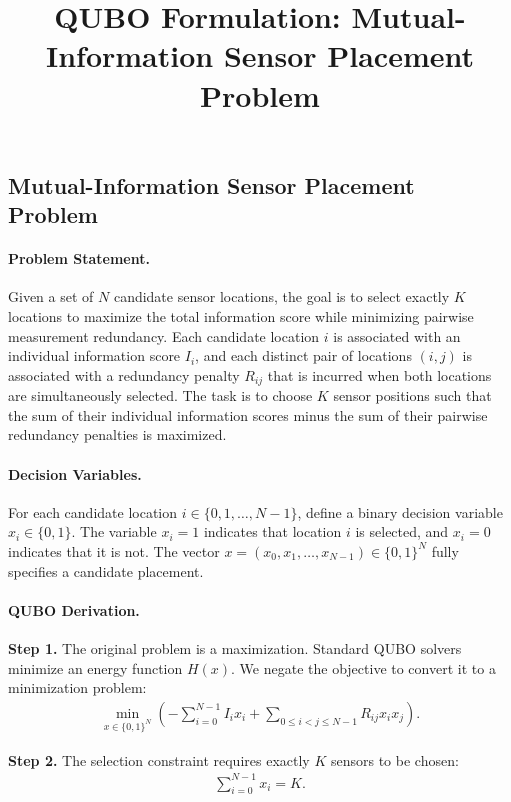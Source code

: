 \documentclass[12pt]{article}
\title{QUBO Formulation: Mutual-Information Sensor Placement Problem}
\date{}
\begin{document}
\maketitle

\subsection*{Mutual-Information Sensor Placement Problem}

\paragraph{Problem Statement.}
Given a set of $N$ candidate sensor locations, the goal is to select exactly $K$ locations to maximize the total information score while minimizing pairwise measurement redundancy. Each candidate location $i$ is associated with an individual information score $I_i$, and each distinct pair of locations $(i,j)$ is associated with a redundancy penalty $R_{ij}$ that is incurred when both locations are simultaneously selected. The task is to choose $K$ sensor positions such that the sum of their individual information scores minus the sum of their pairwise redundancy penalties is maximized.

\paragraph{Decision Variables.}
For each candidate location $i \in \{0, 1, \dots, N-1\}$, define a binary decision variable $x_i \in \{0,1\}$. The variable $x_i = 1$ indicates that location $i$ is selected, and $x_i = 0$ indicates that it is not. The vector $x = (x_0, x_1, \dots, x_{N-1}) \in \{0,1\}^N$ fully specifies a candidate placement.

\paragraph{QUBO Derivation.}
\textbf{Step 1.} The original problem is a maximization. Standard QUBO solvers minimize an energy function $H(x)$. We negate the objective to convert it to a minimization problem:
\begin{align}
\min_{x \in \{0,1\}^N} \left( -\sum_{i=0}^{N-1} I_i x_i + \sum_{0 \leq i < j \leq N-1} R_{ij} x_i x_j \right).
\end{align}

\textbf{Step 2.} The selection constraint requires exactly $K$ sensors to be chosen:
\begin{align}
\sum_{i=0}^{N-1} x_i = K.
\end{align}
\end{document}
